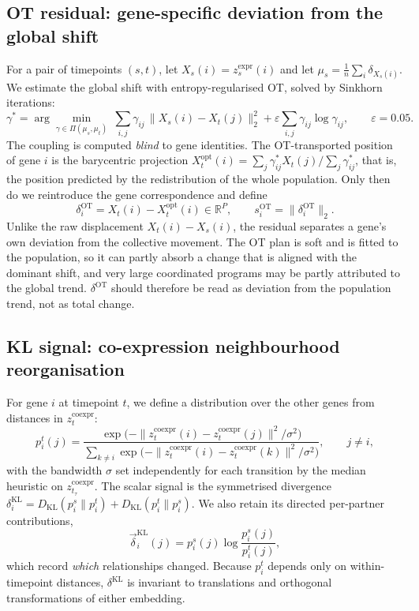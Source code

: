 \documentclass[10pt, letterpaper]{article}
\newcommand{\zco}{z^{\mathrm{coexpr}}}
\newcommand{\zex}{z^{\mathrm{expr}}}
\newcommand{\dOT}{\delta^{\mathrm{OT}}}
\newcommand{\dKL}{\delta^{\mathrm{KL}}}
\newcommand{\vKL}{\vec{\delta}^{\mathrm{KL}}}
\begin{document}
\subsection{OT residual: gene-specific deviation from the global shift}
\label{sec:ot}\label{sec:signals}

For a pair of timepoints $(s,t)$, let $X_s(i)=\zex_s(i)$ and let $\mu_s=\frac1n\sum_i\delta_{X_s(i)}$. We estimate the global shift with entropy-regularised OT, solved by Sinkhorn iterations:
\[
\gamma^\ast=\arg\min_{\gamma\in\Pi(\mu_s,\mu_t)}\ \sum_{i,j}\gamma_{ij}\,\|X_s(i)-X_t(j)\|_2^2+\varepsilon\sum_{i,j}\gamma_{ij}\log\gamma_{ij},\qquad \varepsilon=0.05 .
\]
The coupling is computed \emph{blind} to gene identities. The OT-transported position of gene $i$ is the barycentric projection $X_t^{\mathrm{opt}}(i)=\sum_j\gamma^\ast_{ij}X_t(j)/\sum_j\gamma^\ast_{ij}$, that is, the position predicted by the redistribution of the whole population. Only then do we reintroduce the gene correspondence and define
\[
\dOT_i=X_t(i)-X_t^{\mathrm{opt}}(i)\in\mathbb{R}^P,\qquad s_i^{\mathrm{OT}}=\|\dOT_i\|_2 .
\]
Unlike the raw displacement $X_t(i)-X_s(i)$, the residual separates a gene's own deviation from the collective movement. The OT plan is soft and is fitted to the population, so it can partly absorb a change that is aligned with the dominant shift, and very large coordinated programs may be partly attributed to the global trend. $\dOT$ should therefore be read as deviation from the population trend, not as total change.

\subsection{KL signal: co-expression neighbourhood reorganisation}
\label{sec:kl}

For gene $i$ at timepoint $t$, we define a distribution over the other genes from distances in $\zco_t$:
\[
p_i^t(j)=\frac{\exp\!\big(-\|\zco_t(i)-\zco_t(j)\|^2/\sigma^2\big)}{\sum_{k\neq i}\exp\!\big(-\|\zco_t(i)-\zco_t(k)\|^2/\sigma^2\big)},\qquad j\neq i,
\]
with the bandwidth $\sigma$ set independently for each transition by the median heuristic on $\zco_{t_\tau}$. The scalar signal is the symmetrised divergence $\dKL_i=D_{\mathrm{KL}}(p_i^s\|p_i^t)+D_{\mathrm{KL}}(p_i^t\|p_i^s)$. We also retain its directed per-partner contributions,
\[
\vKL_i(j)=p_i^s(j)\log\frac{p_i^s(j)}{p_i^t(j)},
\]
which record \emph{which} relationships changed. Because $p_i^t$ depends only on within-timepoint distances, $\dKL$ is invariant to translations and orthogonal transformations of either embedding. 
\end{document}
